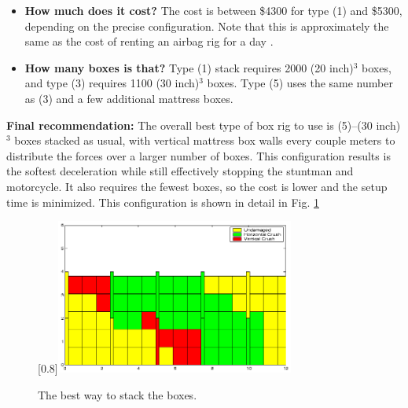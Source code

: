\documentclass[12pt,a4paper,titlepage]{article}
\begin{document}
\begin{itemize}
\item {\bf How much does it cost?}  The cost is between \$4300 for type (1) and \$5300, depending
on the precise configuration.  Note that this is approximately the same as the cost of renting an
airbag rig for a day \cite{MM}.

\item {\bf How many boxes is that?}  Type (1) stack requires 2000 (20 inch)$^3$ boxes, and type (3) requires 1100 (30 inch)$^3$ boxes.
Type (5) uses the same number as (3) and a few additional mattress boxes.

\end{itemize}

{\bf Final recommendation:} The overall best type of box rig to use is (5)--(30 inch)$^3$ boxes stacked as usual,
with vertical mattress box walls every couple meters to distribute the forces over a larger number of boxes.  This
configuration results is the softest deceleration while still effectively stopping the stuntman and motorcycle.  It
also requires the fewest boxes, so the cost is lower and the setup time is minimized.  This configuration is shown in detail in Fig. \ref{case7}
\begin{figure}
\caption{\label{case7} The best way to stack the boxes.}
\begin{center}
\scalebox{1.0}[0.8]{\includegraphics[width=0.7\textwidth]{case73.eps}}
\end{center}
\end{figure}
\end{document}

